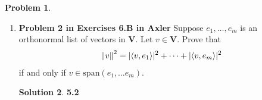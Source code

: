 \documentclass{article}
\theoremstyle{definition}
\newtheorem*{prob*}{Problem}
\newtheorem*{sln*}{Solution}
\newcommand{\V}{\mathbf{V}}
\newcommand{\xpan}{\text{span}}
\newcommand{\la}{\langle}
\newcommand{\ra}{\rangle}
\begin{document}
\begin{prob*}
\begin{enumerate}
\begin{sln*}
			 Now, consider the subspaces $\xpan(z_1,\dots,z_n,y_N)$ and $\xpan(z_1,\dots,_n,w)$. By definition,
			 \begin{align*}
			 \xpan(z_1,\dots,z_n,y_N) &= \left\{ a_1 z_1 + \dots a_n z_n + b y_N \bigg\vert a_1,\dots,a_n,b \in \mathbb{C} \right\}\\
			 \xpan(z_1,\dots,z_n,w) &= \left\{ a_1 z_1 + \dots a_n z_n + b w \bigg\vert a_1,\dots,a_n,b \in \mathbb{C} \right\}.
			 \end{align*}
			 But for $y = \norm{y}y_N = w - \alpha_1 z_1 - \alpha_2 z_2 - \dots - \alpha_n z_n$,
			 \begin{align*}
			 w = \alpha_1 z_1 + \dots + \alpha_n z_n + y = \alpha_1 z_1 + \dots + \alpha_n z_n + \norm{y} y_N.
			 \end{align*}
			 So,
			 \begin{align*}
			 \xpan(z_1,\dots,z_n,w) &= \left\{ c_1z_1 + \dots + c_n z_n + d y_N\bigg\vert c_1,\dots,c_n,d \in \mathbb{C} \right\}\\
			 &=\xpan(z_1,\dots,z_n,y_N).
			 \end{align*}
			 Therefore, given $w\in \V$ and the $z_i$'s, we have shown there exists a vector $y \in \V$ that satisfies all the requirements. In particular, 
			 \begin{align*}
			 y = \frac{w - \alpha_1 z_1 - \alpha_2 z_2 - \dots - \alpha_n z_n}{\norm{w - \alpha_1 z_1 - \alpha_2 z_2 - \dots - \alpha_n z_n}}
			 \end{align*}
			 
		\end{sln*}
	
	
		\newpage
		
		
		\item \textbf{Problem 2 in Exercises 6.B in Axler} Suppose $e_1,\dots,e_m$ is an orthonormal list of vectors in $\V$. Let $v\in \V$. Prove that 
		\begin{align*}
		\norm{v}^2= \vert \la v, e_1 \ra \vert^2 + \dots + \vert \la v, e_m \ra \vert^2
		\end{align*}
		if and only if $v\in \xpan(e_1, \dots e_m)$.
		
		
		
		\begin{sln*}\textbf{5.2}
			
		\end{sln*}
	\end{enumerate}
\end{prob*}
\end{document}

